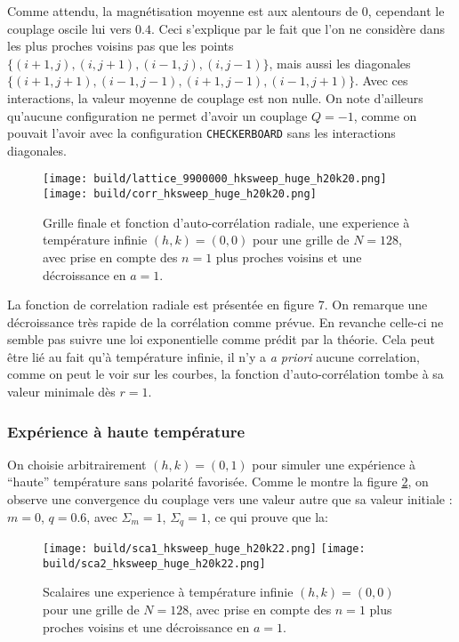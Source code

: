 \documentclass[a4paper, 11pt]{article}
\begin{document}
Comme attendu, la magnétisation moyenne est aux alentours de $0$, cependant le couplage oscile lui
vers $0.4$. Ceci s'explique par le fait que l'on ne considère dans les plus proches voisins pas que
les points $\{(i+1, j), (i, j+1), (i-1, j), (i, j-1)\}$, mais aussi les diagonales $\{(i+1, j+1),
(i-1, j-1), (i+1, j-1), (i-1, j+1)\}$. Avec ces interactions, la valeur moyenne de couplage est non
nulle. On note d'ailleurs qu'aucune configuration ne permet d'avoir un couplage $Q=-1$, comme on
pouvait l'avoir avec la configuration \texttt{CHECKERBOARD} sans les interactions diagonales. 

\begin{figure}
    \centering
    \texttt{[image: build/lattice\_9900000\_hksweep\_huge\_h20k20.png]}
    \texttt{[image: build/corr\_hksweep\_huge\_h20k20.png]}
    \caption{Grille finale et fonction d'auto-corrélation radiale, une experience à température
    infinie $(h, k) = (0, 0)$ pour une grille de $N=128$, avec prise en compte des $n=1$ plus
    proches voisins et une décroissance en $a=1$.} 
    \label{fig:inf_en_sca}
\end{figure}

La fonction de correlation radiale est présentée en figure 7. On remarque une décroissance très
rapide de la corrélation comme prévue. En revanche celle-ci ne semble pas suivre une loi exponentielle
comme prédit par la théorie. Cela peut être lié au fait qu'à température infinie, il n'y a \emph{a
priori} aucune correlation, comme on peut le voir sur les courbes, la fonction d'auto-corrélation
tombe à sa valeur minimale dès $r=1$.

\subsubsection{Expérience à haute température}

On choisie arbitrairement $(h, k) = (0, 1)$ pour simuler une expérience à ``haute'' température sans
polarité favorisée. Comme le montre la figure
\ref{fig:high_en_sca}, on observe une convergence du couplage vers une valeur autre que sa valeur
initiale : $m = 0$, $q=0.6$, avec $\Sigma_m = 1$, $\Sigma_q = 1$, ce qui prouve que la:

\begin{figure}
    \centering
    \texttt{[image: build/sca1\_hksweep\_huge\_h20k22.png]}
    \texttt{[image: build/sca2\_hksweep\_huge\_h20k22.png]}
    \caption{Scalaires une experience à température infinie $(h, k) = (0, 0)$ pour une grille de
    $N=128$, avec prise en compte des $n=1$ plus proches voisins et une décroissance en $a=1$.}
    \label{fig:high_en_sca}
\end{figure}
\end{document}
